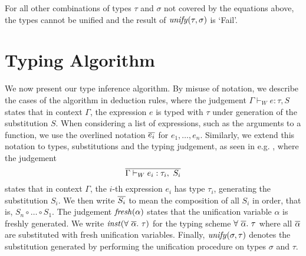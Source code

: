 For all other combinations of types $\tau$ and $\sigma$ not covered by the
equations above, the types cannot be unified and the result of
$\mathit{unify}(\tau,\sigma)$ is `\textsf{Fail}'.


\section{Typing Algorithm}

We now present our type inference algorithm. By misuse of notation, we describe
the cases of the algorithm in deduction rules, where the judgement
$\Gamma \vdash_W e : \tau, S$ states that in context $\Gamma$, the expression $e$
is typed with $\tau$ under generation of the substitution $S$.
When considering a list of expressions, such as the arguments to a function, we
use the overlined notation $\overline{e_i}$ for $e_1,\dots,e_n$. Similarly, we
extend this notation to types, substitutions and the typing judgement, as seen
in e.g. , where the judgement
\[ \overline{ \Gamma \vdash_W e_i : \tau_i,\ S_i } \]
states that in context $\Gamma$, the $i$-th expression $e_i$ has type $\tau_i$,
generating the substitution $S_i$. We then write $\overline{S_i}$ to mean the
composition of all $S_i$ in order, that is, $S_n \circ \dots \circ S_1$.
The judgement $\mathit{fresh}(\alpha)$ states that the unification variable $\alpha$ is
freshly generated. We write $\inst(\forall\ \set{\alpha}.\ \tau)$ for the
typing scheme $\forall\ \overline{\alpha}.\ \tau$ where all $\overline{\alpha}$ are
substituted with fresh unification variables.
Finally, $\mathit{unify}(\sigma,\tau)$ denotes the substitution generated by performing
the unification procedure on types $\sigma$ and $\tau$.

